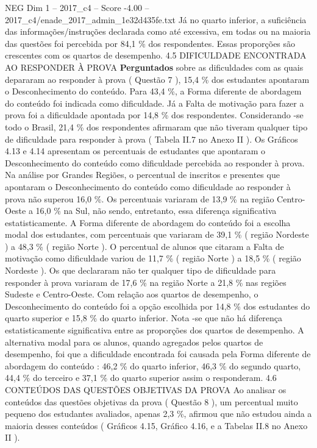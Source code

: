 \begin{textsample}{NEG Dim 1 – 2017\_c4 – Score -4.00 – 2017\_c4/enade\_2017\_admin\_1e32d435fe.txt}
Já no quarto inferior, a suficiência das informações/instruções declarada como até excessiva, em todas ou na maioria das questões foi percebida por 84,1 \% dos respondentes.
Essas proporções são crescentes com os quartos de desempenho. 4.5 DIFICULDADE ENCONTRADA AO RESPONDER À PROVA \textbf{Perguntados} sobre as dificuldades com as quais depararam ao responder à prova ( Questão 7 ), 15,4 \% dos estudantes apontaram o Desconhecimento do conteúdo.
Para 43,4 \%, a Forma diferente de abordagem do conteúdo foi indicada como dificuldade.
Já a Falta de motivação para fazer a prova foi a dificuldade apontada por 14,8 \% dos respondentes.
Considerando -se todo o Brasil, 21,4 \% dos respondentes afirmaram que não tiveram qualquer tipo de dificuldade para responder à prova ( Tabela II.7 no Anexo II ).
Os Gráficos 4.13 e 4.14 apresentam os percentuais de estudantes que apontaram o Desconhecimento do conteúdo como dificuldade percebida ao responder à prova.
Na análise por Grandes Regiões, o percentual de inscritos e presentes que apontaram o Desconhecimento do conteúdo como dificuldade ao responder à prova não superou 16,0 \%.
Os percentuais variaram de 13,9 \% na região Centro-Oeste a 16,0 \% na Sul, não sendo, entretanto, essa diferença significativa estatisticamente.
A Forma diferente de abordagem do conteúdo foi a escolha modal dos estudantes, com percentuais que variaram de 39,1 \% ( região Nordeste ) a 48,3 \% ( região Norte ).
O percentual de alunos que citaram a Falta de motivação como dificuldade variou de 11,7 \% ( região Norte ) a 18,5 \% ( região Nordeste ).
Os que declararam não ter qualquer tipo de dificuldade para responder à prova variaram de 17,6 \% na região Norte a 21,8 \% nas regiões Sudeste e Centro-Oeste.
Com relação aos quartos de desempenho, o Desconhecimento do conteúdo foi a opção escolhida por 14,8 \% dos estudantes do quarto superior e 15,8 \% do quarto inferior.
Nota -se que não há diferença estatisticamente significativa entre as proporções dos quartos de desempenho.
A alternativa modal para os alunos, quando agregados pelos quartos de desempenho, foi que a dificuldade encontrada foi causada pela Forma diferente de abordagem do conteúdo : 46,2 \% do quarto inferior, 46,3 \% do segundo quarto, 44,4 \% do terceiro e 37,1 \% do quarto superior assim o responderam. 4.6 CONTEÚDOS DAS QUESTÕES OBJETIVAS DA PROVA Ao analisar os conteúdos das questões objetivas da prova ( Questão 8 ), um percentual muito pequeno dos estudantes avaliados, apenas 2,3 \%, afirmou que não estudou ainda a maioria desses conteúdos ( Gráficos 4.15, Gráfico 4.16, e a Tabelas II.8 no Anexo II ).

\end{textsample}
